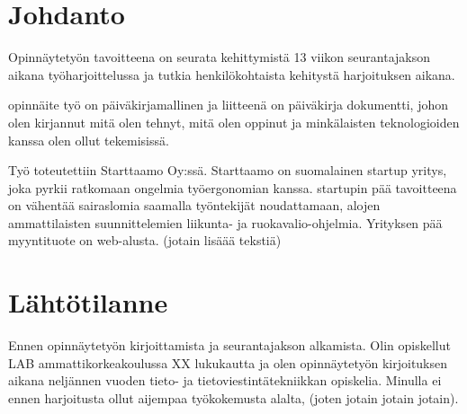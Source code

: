 \documentclass[11pt,a4paper,titlepage,oneside]{article}
\begin{document}
\clearpage
\setcounter{page}{1}

\pagestyle{fancy}
\lfoot{}
\cfoot{}
\rfoot{}
\lhead{}
\chead{}
\rhead{\thepage}
\renewcommand{\headrulewidth}{0pt}
\renewcommand{\footrulewidth}{0pt}


\section{Johdanto}              %





Opinnäytetyön tavoitteena on seurata kehittymistä 13 viikon seurantajakson aikana työharjoittelussa 
ja tutkia henkilökohtaista kehitystä harjoituksen aikana.
\medskip


opinnäite työ on päiväkirjamallinen ja liitteenä on päiväkirja dokumentti, 
johon olen kirjannut mitä olen tehnyt, mitä olen oppinut ja minkälaisten teknologioiden kanssa olen ollut tekemisissä.
\medskip


Työ toteutettiin Starttaamo Oy:ssä. Starttaamo on suomalainen startup yritys, joka pyrkii ratkomaan ongelmia työergonomian kanssa.
startupin pää tavoitteena on vähentää sairaslomia saamalla työntekijät noudattamaan, alojen ammattilaisten suunnittelemien liikunta- ja ruokavalio-ohjelmia. 
Yrityksen pää myyntituote on web-alusta. (jotain lisäää tekstiä)
\medskip






\newpage
\section{Lähtötilanne}         %


Ennen opinnäytetyön kirjoittamista ja seurantajakson alkamista. 
Olin opiskellut LAB ammattikorkeakoulussa XX lukukautta ja olen opinnäytetyön kirjoituksen aikana neljännen vuoden tieto- ja tietoviestintätekniikkan opiskelia.
%
Minulla ei ennen harjoitusta ollut aijempaa työkokemusta alalta, (joten jotain jotain jotain).
\medskip
\end{document}
